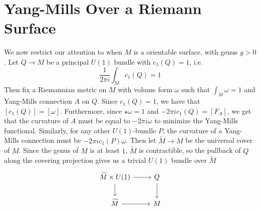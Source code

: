 \documentclass[psamsfonts, 12pt]{amsart}
\theoremstyle{definition}
\theoremstyle{remark}
\newcommand{\C}{\mathbb{C}}
\newcommand{\dbar}{\overline{\partial}}
\newcommand{\g}{\mathfrak{g}}
\newcommand{\defeq}{\vcentcolon=}
\DeclareMathOperator{\id}{id}
\begin{document}
\section{Yang-Mills Over a Riemann Surface}
%
\iffalse
The Hodge star operator maps $\Omega^1_M \to \Omega^1_M$, and satisfies
$\star^2 = -\id$, which induces an almost complex structure on $M$, giving us a
decomposition $\Omega^1_M(\C) = \Omega^{1,0}_M(\C) \oplus \Omega^{0,1}_M(\C)$
into the $\pm i$ eigenspaces of the complexified Hodge star. The operator
$\dbar \defeq \pi^{0,1} \circ d$ (where $\pi^{0,1}$ denotes projection onto
$\Omega^{0,1}_M(\C)$) satisfies $\dbar^2 = 0$ since by dimension reasons,
$\Omega^{0,2}_M(\C) = 0$, so the induced almost complex structure is integrable by the
Newlander-Nirenberg theorem. The same argument with projection onto $\Omega^{1,0}_M(\C)$
gives an operator $\partial$ satisfying $\partial^2 = 0$, and we get a decomposition
$d = \partial + \dbar$. Then given a principal bundle $P \to M$, We get a similar
decomposition for $\Omega^1_M(\g_P)$ after complexification giving a decomposition
$d_A = \partial_A + \dbar_A$ for any connection $A \in \mathscr{A}(P)$.
\fi
We now restrict our attention to when $M$ is a orientable surface, with genus $g > 0$.
Let $Q \to M$ be a principal $U(1)$ bundle with $c_1(Q) = 1$, i.e.
\[
\frac{1}{2\pi i} \int_M c_1(Q) = 1
\]
Then fix a Riemannian metric on $M$ with volume form $\omega$ such that
$\int_M \omega = 1$ and Yang-Mills connection $A$ on $Q$. Since $c_1(Q) = 1$, we have
that $[c_1(Q)] = [\omega]$. Furthermore, since $\star\omega = 1$ and
$-2\pi i c_1(Q) = [F_A]$, we get that the curvature of $A$ must be equal to
$-2\pi i \omega$ to minimize the Yang-Mills functional. Similarly, for any other
$U(1)$-bundle $P$, the curvature of a Yang-Mills connection must be
$-2\pi i c_1(P)\omega$. Then let $\widetilde{M} \to M$ be the universal cover of $M$.
Since the genus of $M$ is at least $1$, $\widetilde{M}$
is contractible, so the pullback of $Q$ along the covering projection gives us a
trivial $U(1)$ bundle over $\widetilde{M}$
\[\begin{tikzcd}
\widetilde{M} \times U(1)\ar[d] \ar[r] & Q \ar[d]\\
\widetilde{M} \ar[r] & M
\end{tikzcd}\]
\end{document}
